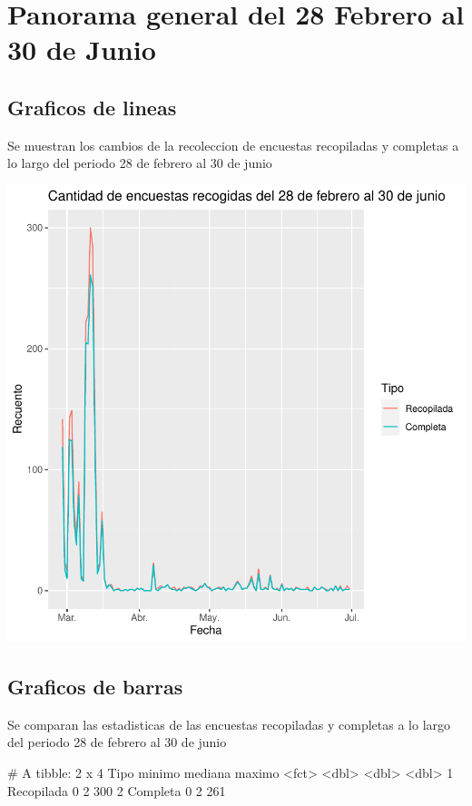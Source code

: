 \documentclass{article}
\begin{document}
\section{Panorama general del 28 Febrero al 30 de Junio}
\subsection{Graficos de lineas}
Se muestran los cambios de la recoleccion de encuestas recopiladas y completas a lo largo del periodo 28 de febrero al 30 de junio

\includegraphics{seguimento2-004}

\subsection{Graficos de barras}
Se comparan las estadisticas de las encuestas recopiladas y completas a lo largo del periodo 28 de febrero al 30 de junio

\begin{Schunk}
\begin{Soutput}
# A tibble: 2 x 4
  Tipo       minimo mediana maximo
  <fct>       <dbl>   <dbl>  <dbl>
1 Recopilada      0       2    300
2 Completa        0       2    261
\end{Soutput}
\end{Schunk}
\end{document}

